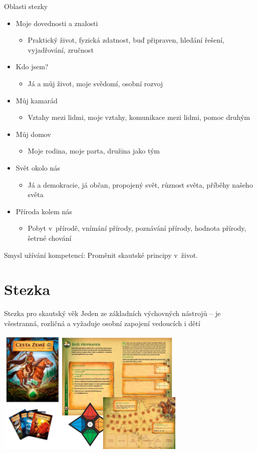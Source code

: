 \documentclass[compress,utf8,xcolor=dvipsnames]{beamer}
\begin{document}
\begin{frame}{Oblasti stezky}
\begin{itemize}
\item Moje dovednosti a znalosti
 \begin{itemize}
 \item Praktický život, fyzická zdatnost, buď připraven, hledání řešení, vyjadřování, zručnost
 \end{itemize}
\item Kdo jsem?
 \begin{itemize}
 \item Já a můj život, moje svědomí, osobní rozvoj
 \end{itemize}
\item Můj kamarád
 \begin{itemize}
 \item Vztahy mezi lidmi, moje vztahy, komunikace mezi lidmi, pomoc druhým
 \end{itemize}
\item Můj domov
 \begin{itemize}
 \item Moje rodina, moje parta, družina jako tým
 \end{itemize}
\item Svět okolo nás
 \begin{itemize}
 \item Já a demokracie, já občan, propojený svět, různost světa, příběhy našeho světa
 \end{itemize}
\item Příroda kolem nás
 \begin{itemize}
 \item Pobyt v přírodě, vnímání přírody, poznávání přírody, hodnota přírody, šetrné chování
 \end{itemize}
\end{itemize}
Smysl užívání kompetencí: Proměnit skautské principy v~život.
\end{frame}

\section{Stezka}

\begin{frame}{Stezka pro skautský věk}
Jeden ze základních výchovných nástrojů -- je všestranná, rozličná a vyžaduje osobní zapojení vedoucích i dětí
\begin{center}
\includegraphics[height=6cm]{stezka.png}
\end{center}
\end{frame}
\end{document}
